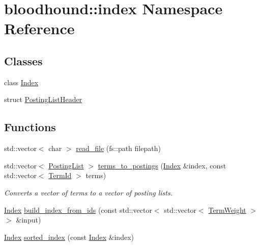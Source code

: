 \hypertarget{namespacebloodhound_1_1index}{}\section{bloodhound\+:\+:index Namespace Reference}
\label{namespacebloodhound_1_1index}
\subsection*{Classes}
\begin{DoxyCompactItemize}
\item 
class \hyperlink{classbloodhound_1_1index_1_1Index}{Index}
\item 
struct \hyperlink{structbloodhound_1_1index_1_1PostingListHeader}{Posting\+List\+Header}
\end{DoxyCompactItemize}
\subsection*{Functions}
\begin{DoxyCompactItemize}
\item 
std\+::vector$<$ char $>$ \hyperlink{namespacebloodhound_1_1index_a4b6f89a17c10bf2927aff24df7081bb3}{read\+\_\+file} (fs\+::path filepath)
\item 
std\+::vector$<$ \hyperlink{classbloodhound_1_1PostingList}{Posting\+List} $>$ \hyperlink{namespacebloodhound_1_1index_ae2ed61317e7a37db7d9f19d2b65e2a11}{terms\+\_\+to\+\_\+postings} (\hyperlink{classbloodhound_1_1index_1_1Index}{Index} \&index, const std\+::vector$<$ \hyperlink{structbloodhound_1_1TermId}{Term\+Id} $>$ terms)
\begin{DoxyCompactList}\small\item\em Converts a vector of terms to a vector of posting lists. \end{DoxyCompactList}\item 
\hyperlink{classbloodhound_1_1index_1_1Index}{Index} \hyperlink{namespacebloodhound_1_1index_a95536aba16676e4fd8aefda07f19eaee}{build\+\_\+index\+\_\+from\+\_\+ids} (const std\+::vector$<$ std\+::vector$<$ \hyperlink{structbloodhound_1_1TermWeight}{Term\+Weight} $>$$>$ \&input)
\item 
\hyperlink{classbloodhound_1_1index_1_1Index}{Index} \hyperlink{namespacebloodhound_1_1index_ad5486002d12948163bcdeb717c9c611c}{sorted\+\_\+index} (const \hyperlink{classbloodhound_1_1index_1_1Index}{Index} \&index)
\end{DoxyCompactItemize}


